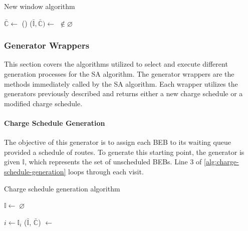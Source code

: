\documentclass[11pt,a4paper,final]{article}
\newcommand{\I}{\mathbb{I}}                 %
\newcommand{\C}{\mathbb{C}}                 %
\newcommand{\Sol}{\mathbb{S}}               %
\begin{document}
\begin{algorithm}[H]
  \caption{New window algorithm} \label{alg:new-window}
  \LinesNumbered
  \KwIn{$\Sol$}
  \KwOut{$\Sol'$}


  \Begin
  {
    $\bar{\C} \leftarrow$\Purge{$\Sol$}
    \If() {($\bar{\I}, \bar{\C}) \leftarrow$ \NewVisit{$\Sol'$} $\not\in \varnothing$}
    {
      \Return{($\bar{\I}, \bar{\C}$)} 
    }

    \Return{($\varnothing$)}
  }
\end{algorithm}

\subsubsection{Generator Wrappers}
\label{sec:generator-wrappers}
This section covers the algorithms utilized to select and execute different generation processes for the SA algorithm.
The generator wrappers are the methods immediately called by the SA algorithm. Each wrapper utilizes the generators
previously described and returns either a new charge schedule or a modified charge schedule.

\paragraph{Charge Schedule Generation}
\label{sec:charge-schedule-generation}
The objective of this generator is to assign each BEB to its waiting queue provided a schedule of routes. To generate
this starting point, the generator is given \(\I\), which represents the set of unscheduled BEBs. Line 3 of
\ref{alg:charge-schedule-generation} loops through each visit.

\begin{algorithm}[H]
\caption{Charge schedule generation algorithm} \label{alg:charge-schedule-generation}
    \LinesNumbered
    \KwIn{$\I$, $\C$}
    \KwOut{$\bar{\I}$, $\bar{\C}$}


    \Begin
    {
        $\I \leftarrow \; \varnothing$

        \ForEach {$\I_i \in \I$}
        {
            $i \leftarrow \I_i$
            ($\bar{\I}$, $\bar{\C}$) $\leftarrow$ \Wait{($i$, $\I$, $\C$)}
        }
            \Return{($\bar{\I}$, $\bar{\C}$)}
    }
  \end{algorithm}
\end{document}
